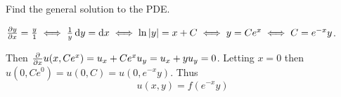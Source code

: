 Find the general solution to the PDE.

\soln* $\pdv{y}{x} = \frac{y}{1} \iff \over{y}\dd{y} = \dd x \iff \ln \abs{y} = x + C \iff y = Ce^x \iff C = e^{-x}y$.

\nl Then $\pdv{x} u(x, Ce^x) = u_x + Ce^x u_y = u_x + yu_y = 0$. Letting $x=0$ then $u(0,Ce^0) = u(0,C) = u(0, e^{-x}y)$. Thus $$u(x,y) = f(e^{-x}y)$$